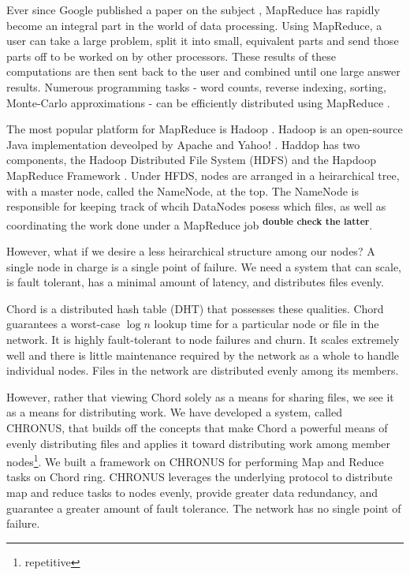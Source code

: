 \documentclass[conference, compsocconf, letterpaper]{IEEEtran}
\begin{document}
Ever since Google published a paper on the subject \cite{mapreduce}, MapReduce has rapidly become an integral part in the world of data processing.  Using MapReduce, a user can take a large problem, split it into small, equivalent parts and send those parts off to be worked on by other processors.  These results of these computations are then sent back to the user and combined until one large answer results.  Numerous programming tasks - word counts, reverse indexing, sorting, Monte-Carlo approximations - can be efficiently distributed using MapReduce \cite{mapreduce}.

The most popular platform for MapReduce is Hadoop \cite{Hadoop}. Hadoop is an open-source Java implementation deveolped by Apache and Yahoo! \cite{pavlo2009comparison}.  Haddop has two components, the Hadoop Distributed File System (HDFS) and the Hapdoop MapReduce Framework \cite{mrsurvey}.  Under HFDS, nodes are arranged in a heirarchical tree, with a master node, called the NameNode, at the top.  The NameNode is responsible for keeping track of whcih DataNodes posess which files, as well as coordinating the work done under a MapReduce job \textsuperscript{\textbf{double check the latter}}. 
 
However, what if we desire a less heirarchical structure among our nodes?  A single node in charge is a single point of failure.  We need a system that can scale, is fault tolerant, has a minimal amount of latency, and distributes files evenly. 

Chord \cite{Chord} is a distributed hash table (DHT) that possesses these qualities.  Chord guarantees a worst-case $\log n$ lookup time for a particular node or file in the network. It is highly fault-tolerant to node failures and churn.  It scales extremely well and there is little maintenance required by the network as a whole to handle individual nodes.  Files in the network are distributed evenly among its members.
 
However, rather that viewing Chord solely as a means for sharing files, we see it as a means for distributing work.  We have developed a system, called CHRONUS, that builds off the concepts that make Chord a powerful means of evenly distributing files and applies it toward distributing work among member nodes\footnote{repetitive}.  We built a framework on CHRONUS for performing Map and Reduce tasks on Chord ring.  CHRONUS leverages the underlying protocol to distribute map and reduce tasks to nodes evenly, provide greater data redundancy, and guarantee a greater amount of fault tolerance.  The network has no single point of failure.
\end{document}
